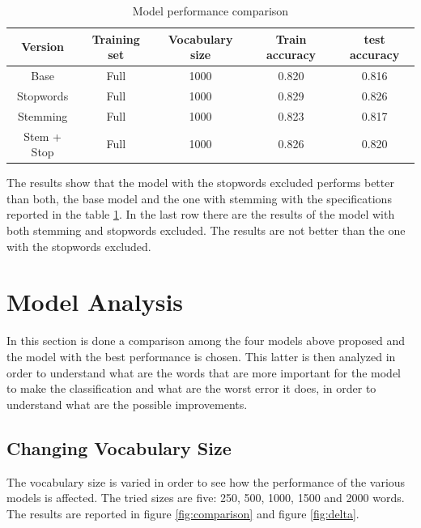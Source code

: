 \documentclass{article}
\begin{document}
    \begin{table}[H]
        \centering
        \caption{\small Model performance comparison}
        \label{tab:comparison_table}
        \begin{tabular}{|c|c|c|c|c|}
        \hline
        \textbf{Version} & \textbf{Training set} & \textbf{Vocabulary size} & \textbf{Train accuracy} & \textbf{test accuracy}\\\hline
        Base & Full & 1000 & 0.820 & 0.816\\\hline
        Stopwords & Full & 1000 & 0.829 & 0.826\\\hline
        Stemming & Full & 1000 & 0.823 & 0.817\\\hline
        Stem + Stop & Full & 1000 & 0.826 & 0.820\\\hline
        \end{tabular}
    \end{table}

\noindent The results show that the model with the stopwords excluded performs better than both, the base model and the one with stemming with the specifications reported
in the table \ref{tab:comparison_table}. In the last row there are the results of the model with both stemming and stopwords excluded. The results are not better than
the one with the stopwords excluded.


    
\section{Model Analysis}
In this section is done a comparison among the four models above proposed and the model with the best performance is chosen. This latter is then analyzed 
in order to understand what are the words that are more important for the model to make the classification and what are the worst error it does, in order to 
understand what are the possible improvements.

\subsection{Changing Vocabulary Size}
The vocabulary size is varied in order to see how the performance of the various models is affected. The tried sizes are five: 250, 500, 1000, 1500 and 2000 words.
The results are reported in figure \ref{fig:comparison} and figure \ref{fig:delta}.\\
\end{document}
